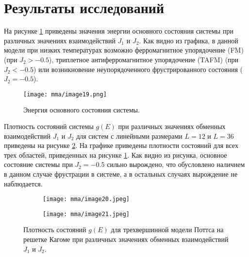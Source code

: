 \section{Результаты исследований}

На рисунке \ref{mma-fig-2} приведены значения энергии основного состояния системы при различных значениях взаимодействий $J_1$ и $J_2$. Как видно из графика, в данной модели при низких температурах возможно ферромагнитное упорядочение (FM) (при $J_2 > -0.5$), триплетное антиферромагнитное упорядочение (TAFM) (при $J_2 < -0.5$) или возникновение неупорядоченного фрустрированного состояния ($J_2 = -0.5$).
\begin{figure}[h]
    \begin{center}
        \texttt{[image: mma/image19.png]}
    \end{center}
    \caption{Энергия основного состояния системы.}
    \label{mma-fig-2}
\end{figure}

Плотность состояний системы $g(E)$ при различных значениях обменных взаимодействий $J_1$ и $J_2$ для систем с линейными размерами $L = 12$ и $L = 36$ приведены на рисунке \ref{mma-fig-3}. На графике приведены плотности состояний для всех трех областей, приведенных на рисунке \ref{mma-fig-2}. Как видно из рисунка, основное состояние системы при $J_2 = -0.5$ сильно вырождено, что обусловлено наличием в данном случае фрустрации в системе, а в остальных случаях вырождение не наблюдается.
\begin{figure}[h]
    \begin{center}
        \begin{subfigure}{0.45\textwidth}
            \begin{center}
                \texttt{[image: mma/image20.jpeg]}
            \end{center}
        \end{subfigure}
        \begin{subfigure}{0.45\textwidth}
            \begin{center}
                \texttt{[image: mma/image21.jpeg]}
            \end{center}
        \end{subfigure}
    \end{center}
    \caption{Плотность состояний $g(E)$ для трехвершинной модели Поттса на решетке Кагоме при различных значениях обменных взаимодействий $J_1$ и $J_2$.}
    \label{mma-fig-3}
\end{figure}

